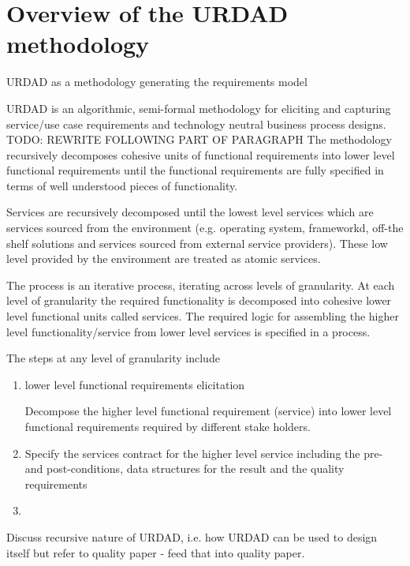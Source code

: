 \section{Overview of the URDAD methodology \label{sec:urdadMethodology}}

URDAD as a methodology generating the requirements model

URDAD is an algorithmic, semi-formal methodology for eliciting and capturing service/use case requirements and technology neutral business process designs\cite{solms_urdad_2010}. 
TODO: REWRITE FOLLOWING PART OF PARAGRAPH
 The methodology recursively decomposes cohesive units of functional requirements into lower level functional requirements until the functional requirements are
fully specified in terms of well understood pieces of functionality.

Services are recursively decomposed until the lowest level services which are services sourced from the environment (e.g. operating system, frameworkd, off-the shelf solutions and services sourced from external service providers). These low level provided by the environment are treated as atomic services.

The process is an iterative process, iterating across levels of granularity. At each level of granularity the required functionality is decomposed into cohesive lower level functional units called services. The required logic for assembling the higher level functionality/service from lower level services is specified in a process.

The steps at any level of granularity include
\begin{enumerate}
 \item lower level {functional requirements elicitation}
 
Decompose the higher level functional requirement (service) into lower level functional requirements required by different stake holders.
 \item Specify the services contract for the higher level service including the pre- and post-conditions, data structures for the result and the quality requirements
 \item 
\end{enumerate}

Discuss recursive nature of URDAD, i.e. how URDAD can be used to design itself but refer to quality paper - feed that into quality paper.

